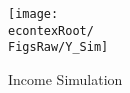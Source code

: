 \begin{figure}[]
	\centerline{\texttt{[image: \\econtexRoot/\\FigsRaw/Y\_Sim]}}
	\caption{Income Simulation}
	\label{fig:YSim}
\end{figure}
